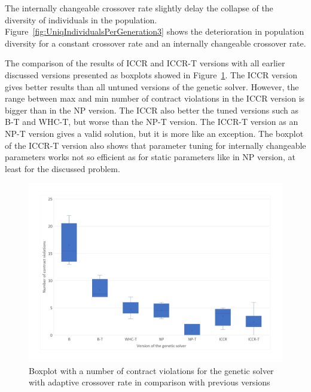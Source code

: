 The internally changeable crossover rate slightly delay the collapse of the diversity of individuals in the population. Figure~\ref{fig:UniqIndividualsPerGeneration3} shows the deterioration in population diversity for a constant crossover rate and an internally changeable crossover rate.


The comparison of the results of ICCR and ICCR-T versions with all earlier discussed versions presented as boxplots showed in Figure~\ref{fig:boxplotsolverAdaptiveCrossoverTuning}. The ICCR version gives better results than all untuned versions of the genetic solver. However, the range between max and min number of contract violations in the ICCR version is bigger than in the NP version.
The ICCR also better the tuned versions such as B-T and WHC-T, but worse than the NP-T version. The ICCR-T version as an NP-T version gives a valid solution, but it is more like an exception. The boxplot of the ICCR-T version also shows that parameter tuning for internally changeable parameters works not so efficient as for static parameters like in NP version, at least for the discussed problem. 

\begin{figure}
	\centering
	\includegraphics[width=\textwidth]{images/BoxPlotSolverAdaptiveCrossoverTuning.pdf}
	\caption[Boxplot with a number of contract violations for the genetic solver with adaptive crossover rate in comparison with previous versions]{Boxplot with a number of contract violations for the genetic solver with adaptive crossover rate in comparison with previous versions}
	\label{fig:boxplotsolverAdaptiveCrossoverTuning}
\end{figure}


